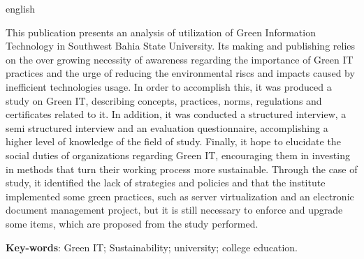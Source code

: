 \begin{resumo}[Abstract]
 \begin{otherlanguage*}{english}
 
  This publication presents an analysis of utilization of Green Information Technology in Southwest Bahia State University. Its making and publishing relies on the over growing necessity of awareness regarding the importance of Green IT practices and the urge of reducing the environmental riscs and impacts caused by inefficient technologies usage. In order to accomplish this, it was produced a study on Green IT, describing concepts, practices, norms, regulations and certificates related to it. In addition, it was conducted a structured interview, a semi structured interview and an evaluation questionnaire,  accomplishing a higher level of knowledge of the field of study. Finally, it hope to elucidate the  social duties of organizations regarding Green IT, encouraging them in investing in methods that turn their working process more sustainable. Through the case of study, it identified the lack of strategies and policies and that the institute implemented some green practices, such as server virtualization and an electronic document management project, but it is still necessary to enforce and upgrade some items, which are proposed from the study performed.
  
   \vspace{\onelineskip}
 
   \noindent 
   \textbf{Key-words}: Green IT; Sustainability; university; college education.
 \end{otherlanguage*}
\end{resumo}